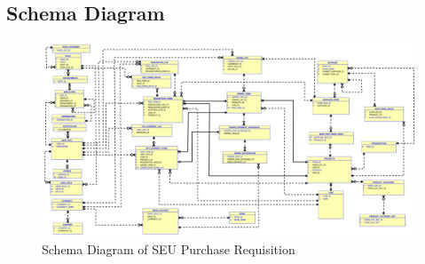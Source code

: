 \documentclass[12pt]{report} %
\begin{document}
\begin{landscape}
\subsection{Schema Diagram}
\begin{figure}[h]
	\begin{center}
		\includegraphics[width=1.3\textwidth]{pic/schema/seupr_schema.png}
	\end{center}
	\caption{Schema Diagram of SEU Purchase Requisition}
	\label{fig:context_level}
\end{figure}
\thispagestyle{empty} 
\end{landscape}

\restoregeometry
\end{document}
